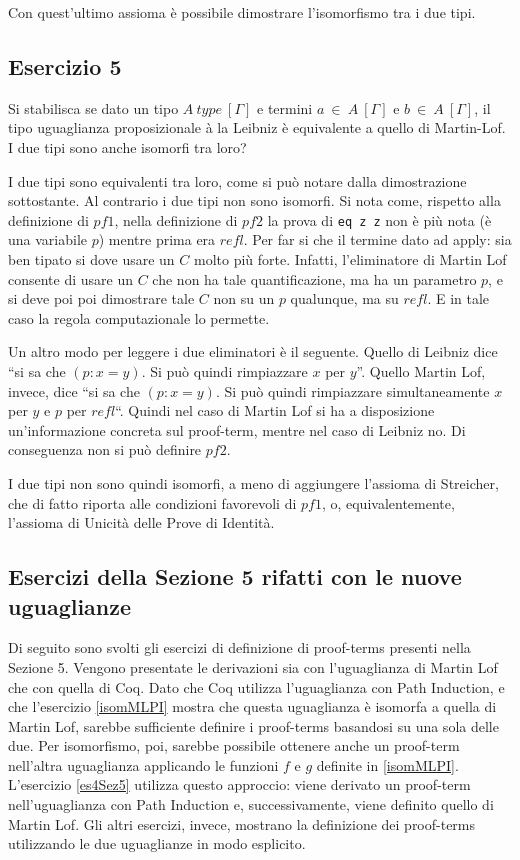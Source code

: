 Con quest'ultimo assioma è possibile dimostrare l'isomorfismo tra i due tipi.



\subsection{Esercizio 5}
\begin{thm}
	Si stabilisca se dato un tipo $A~type~[\Gamma]$ e termini $a~\in~A~[\Gamma]$ e $b~\in~A~[\Gamma]$, il tipo uguaglianza proposizionale à la Leibniz è equivalente a quello di Martin-Lof. I due tipi sono anche isomorfi tra loro?
\end{thm}
I due tipi sono equivalenti tra loro, come si può notare dalla dimostrazione sottostante. Al contrario i due tipi non sono isomorfi. Si nota come, rispetto alla definizione di $pf1$, nella definizione di $pf2$ la prova di \texttt{eq z z} non è più nota (è una variabile $p$) mentre prima era $refl$. Per far si che il termine dato ad apply: sia ben tipato si dove usare un $C$ molto più forte. Infatti, l'eliminatore di Martin Lof consente di usare un $C$ che non ha tale quantificazione, ma ha un parametro $p$, e si deve poi poi dimostrare tale $C$ non su un $p$ qualunque, ma su $refl$.  E in tale caso la regola computazionale lo permette.

Un altro modo per leggere i due eliminatori è il seguente. Quello di Leibniz dice ``si sa che $(p : x = y)$. Si può quindi rimpiazzare $x$ per $y$''. Quello Martin Lof, invece, dice ``si sa che $(p : x = y)$. Si può quindi rimpiazzare simultaneamente $x$ per $y$ e $p$ per $refl$``. Quindi nel caso di Martin Lof si ha a disposizione un'informazione concreta sul proof-term, mentre nel caso di Leibniz no. Di conseguenza non si può definire $pf2$.

I due tipi non sono quindi isomorfi, a meno di aggiungere l'assioma di Streicher, che di fatto riporta alle condizioni favorevoli di $pf1$, o, equivalentemente, l'assioma di Unicità delle Prove di Identità.


\subsection{Esercizi della Sezione 5 rifatti con le nuove uguaglianze}
Di seguito sono svolti gli esercizi di definizione di proof-terms presenti nella Sezione 5. Vengono presentate le derivazioni sia con l'uguaglianza di Martin Lof che con quella di Coq. Dato che Coq utilizza l'uguaglianza con Path Induction, e che l'esercizio \ref{isomMLPI} mostra che questa uguaglianza è isomorfa a quella di Martin Lof, sarebbe sufficiente definire i proof-terms basandosi su una sola delle due. Per isomorfismo, poi, sarebbe possibile ottenere anche un proof-term nell'altra uguaglianza applicando le funzioni $f$ e $g$ definite in \ref{isomMLPI}. L'esercizio \ref{es4Sez5} utilizza questo approccio: viene derivato un proof-term nell'uguaglianza con Path Induction e, successivamente, viene definito quello di Martin Lof. Gli altri esercizi, invece, mostrano la definizione dei proof-terms utilizzando le due uguaglianze in modo esplicito.
\setcounter{subsubsection}{1}
